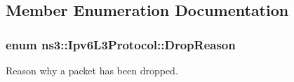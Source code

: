 \subsection{Member Enumeration Documentation}
\subsubsection[{\texorpdfstring{Drop\+Reason}{DropReason}}]{\setlength{\rightskip}{0pt plus 5cm}enum {\bf ns3\+::\+Ipv6\+L3\+Protocol\+::\+Drop\+Reason}}\hypertarget{classns3_1_1Ipv6L3Protocol_a33c64db9bc35f71ff368b132bfffa37a}{}\label{classns3_1_1Ipv6L3Protocol_a33c64db9bc35f71ff368b132bfffa37a}


Reason why a packet has been dropped. 

